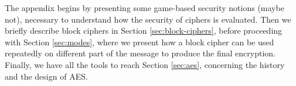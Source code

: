\documentclass[12pt,a4paper]{book}
\theoremstyle{definition}
\begin{document}
	The appendix begins by presenting some game-based security notions (maybe not), necessary to understand how the security of ciphers is evaluated. Then we briefly describe block ciphers in Section \ref{sec:block-ciphers}, before proceeding with Section \ref{sec:modes}, where we present how a block cipher can be used repeatedly on different part of the message to produce the final encryption. Finally, we have all the tools to reach Section \ref{sec:aes}, concerning the history and the design of AES.
	\begin{comment}

	\section{Security definitions}\label{ref:sec-defs}
	In order to evaluate the security of an encryption system, it's necessary to give a precise formulation of what we mean by \textit{"secure"}. Intuitively, when we assess security of a system, we need to take into consideration the interaction between two parties, one who wants to keep an information secret ($\mathcal{A}$) and the other one who wants to illicitely exfiltrate that information ($\mathcal{B}$). Furthermore, we need to define the amount of resources that the adversary can use to guess the value of the information.
	
	The natural way to formalise the interaction between two parties with opposite goals is provided by a branch of mathematics called \textit{game theory}, that allow us to formulate three different notions of security through games. In these games, we distinguish two actors:
	\begin{itemize}
		\item the \textbf{Challenger}, who represent the honest party. Their task is to provide a challenge that must be solved;
		\item the \textbf{Attacker}, whose goal is to solve the challenge, and consequently to win the game, using the resources at their disposal.
	\end{itemize}
	An encryption scheme is considered to be secure, according to a certain security notion, only if the game that models the notion is infeasible for any adversary to win.
	
	\paragraph{Passive indistinguishability}
	 The first security definition models a situation in which the adversary can only passively eavesdrop the message encrypted by the honest party and has no control over it (i.e. it cannot perform any manipulation of the ciphertext), and it's thus known as \textit{passive indistinguishability} (IND-PAS). More precisely, the malicious party cannot encrypt, nor decrypt any message, i.e. they have no access to the encryption or decryption algorithm. 

\end{comment}
\end{document}
